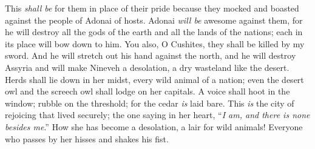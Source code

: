 \begin{biblechapter}
\verse This \textit{shall be} for them in place of their pride 
because they mocked and boasted 
against the people of Adonai of hosts.
\verse Adonai \textit{will be} awesome against them, 
for he will destroy all the gods of the earth 
and all the lands of the nations; 
each in its place will bow down to him.
\verse You also, O Cushites, 
they shall be killed by my sword.
\verse And he will stretch out his hand against the north, 
and he will destroy Assyria 
and will make Nineveh a desolation, 
a dry wasteland like the desert.
\verse Herds shall lie down in her midst, 
every wild animal of a nation; 
even the desert owl and the screech owl 
shall lodge on her capitals. 
A voice shall hoot in the window; 
rubble on the threshold; 
for the cedar \textit{is} laid bare.
\verse This \textit{is} the city of rejoicing 
that lived securely; 
the one saying in her heart, 
“\textit{I am, and there is none besides me}.” 
How she has become a desolation, 
a lair for wild animals! 
Everyone who passes by her hisses and shakes his fist.
\end{biblechapter}

